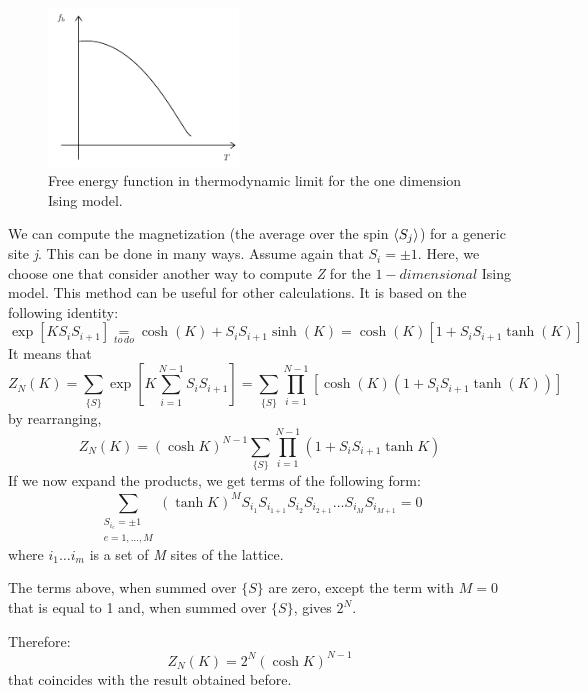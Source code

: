 \documentclass[../main/main.tex]{subfiles}
\begin{document}
\begin{figure}[h!]
\centering
\includegraphics[width=0.45\textwidth]{../lessons/6_image/3.pdf}
\caption{\label{fig:6_3} Free energy function in thermodynamic limit for the one dimension Ising model.}
\end{figure}
We can compute the magnetization (the average over the spin \( \expval{S_j}  \)) for a generic site \emph{j}. This can be done in many ways. Assume again that \( S_i = \pm 1 \). Here, we choose one that consider another way to compute \emph{Z} for the \( 1-dimensional \) Ising model. This method can be useful for other calculations. It is based on the following identity:
\begin{equation}
  \exp [ K S_i S_{i+1}] \underset{to\,do}{=}  \cosh ( K) + S_i S_{i+1} \sinh (K) = \cosh (K) [1+ S_i S_{i+1} \tanh (K)]
\end{equation}
It means that
\begin{equation}
  Z_N (K) = \sum_{\{ S \}  }^{}    \exp [K  \sum_{i=1}^{N-1} S_i S_{i+1}  ] = \sum_{\{ S \}  }^{}   \prod_{i=1}^{N-1} [ \cosh (K) (1+ S_i S_{i+1} \tanh (K))]
\end{equation}
by rearranging,
\begin{equation}
  Z_N (K)= (\cosh K)^{N-1} \sum_{\{S\}}^{}  \prod_{i=1}^{N-1} ( 1 + S_i S_{i+1} \tanh K )
\end{equation}
If we now expand the products, we get terms of the following form:
\begin{equation}
  \sum_{ \substack{ S_{i_e} = \pm 1\\ e= 1, \dots, M} }^{}  (\tanh K )^M S_{i_1} S_{i_{1+1}} S_{i_2} S_{i_{2+1}} \dots S_{i_M} S_{i_{M+1}} = 0
  \label{eq:6_3}
\end{equation}
where \( i_1 \dots i_m \) is a set of \emph{M} sites of the lattice.
\begin{remark}
The terms above, when summed over \( \{ S \}   \) are zero, except the term with \( M=0 \) that is equal to 1 and, when summed over \( \{ S \}   \), gives \( 2^N \).
\end{remark}
Therefore:
\begin{equation}
  Z_N (K) = 2^N (\cosh K)^{N-1}
\end{equation}
that coincides with the result obtained before.
\end{document}
